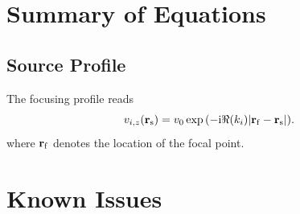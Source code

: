 \documentclass[12pt]{article}
\begin{document}
\section{Summary of Equations}

\subsection{Source Profile}

The focusing profile reads
\begin{equation}
    v_{i,z}(\vb{r}_\mathrm{s})
    =
    v_0 \exp\qty(-\mathrm{i} \real (k_i) \abs{\vb{r}_\mathrm{f} - \vb{r}_\mathrm{s}}).
\end{equation}
where $\vb{r}_\mathrm{f}$ denotes the location of the focal point.


\section{Known Issues}



\end{document}
